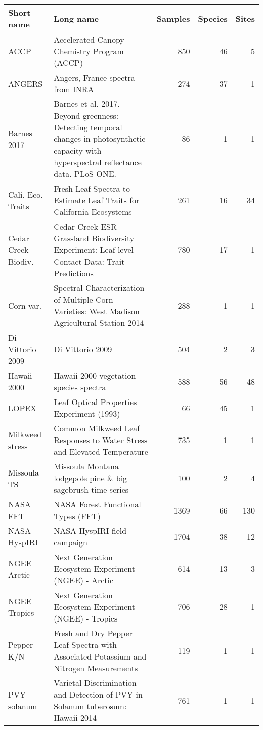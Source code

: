 \begin{table}[H]
\centering\begingroup\fontsize{8}{10}\selectfont

\begin{tabular}{l>{\raggedright\arraybackslash}p{25em}rrr}
\toprule
Short name & Long name & Samples & Species & Sites\\
\midrule
ACCP & Accelerated Canopy Chemistry Program (ACCP) & 850 & 46 & 5\\
ANGERS & Angers, France spectra from INRA & 274 & 37 & 1\\
Barnes 2017 & Barnes et al. 2017. Beyond greenness: Detecting temporal changes in photosynthetic capacity with hyperspectral reflectance data. PLoS ONE. & 86 & 1 & 1\\
Cali. Eco. Traits & Fresh Leaf Spectra to Estimate Leaf Traits for California Ecosystems & 261 & 16 & 34\\
Cedar Creek Biodiv. & 2014 Cedar Creek ESR Grassland Biodiversity Experiment: Leaf-level Contact Data: Trait Predictions & 780 & 17 & 1\\
\addlinespace
Corn var. & Spectral Characterization of Multiple Corn Varieties: West Madison Agricultural Station 2014 & 288 & 1 & 1\\
Di Vittorio 2009 & Di Vittorio 2009 & 504 & 2 & 3\\
Hawaii 2000 & Hawaii 2000 vegetation species spectra & 588 & 56 & 48\\
LOPEX & Leaf Optical Properties Experiment (1993) & 66 & 45 & 1\\
Milkweed stress & Common Milkweed Leaf Responses to Water Stress and Elevated Temperature & 735 & 1 & 1\\
\addlinespace
Missoula TS & Missoula Montana lodgepole pine \& big sagebrush time series & 100 & 2 & 4\\
NASA FFT & NASA Forest Functional Types (FFT) & 1369 & 66 & 130\\
NASA HyspIRI & NASA HyspIRI field campaign & 1704 & 38 & 12\\
NGEE Arctic & Next Generation Ecosystem Experiment (NGEE) - Arctic & 614 & 13 & 3\\
NGEE Tropics & Next Generation Ecosystem Experiment (NGEE) - Tropics & 706 & 28 & 1\\
\addlinespace
Pepper K/N & Fresh and Dry Pepper Leaf Spectra with Associated Potassium and Nitrogen Measurements & 119 & 1 & 1\\
PVY solanum & Varietal Discrimination and Detection of PVY in Solanum tuberosum: Hawaii 2014 & 761 & 1 & 1\\

\end{tabular}
\end{table}
